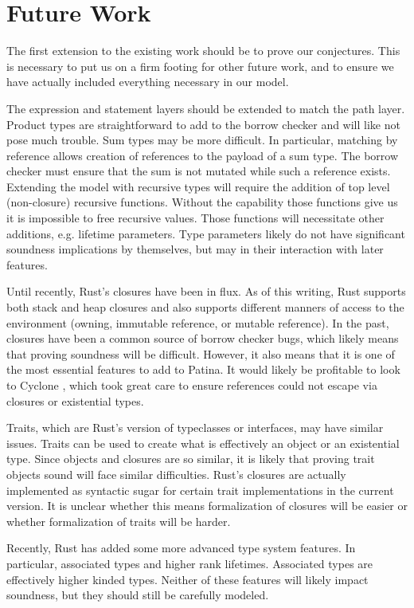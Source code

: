 \section*{Future Work}
The first extension to the existing work should be to prove our conjectures.
This is necessary to put us on a firm footing for other future work, and
to ensure we have actually included everything necessary in our model.

The expression and statement layers should be extended to match the path layer.
Product types are straightforward to add to the borrow checker and will like not
pose much trouble. Sum types may be more difficult. In particular, matching by
reference allows creation of references to the payload of a sum type.
The borrow checker must ensure that the sum is not mutated while such a reference
exists. Extending the model with recursive types will require the addition of
top level (non-closure) recursive functions. Without the capability those functions
give us it is impossible to free recursive values. Those functions will necessitate
other additions, e.g. lifetime parameters. Type parameters likely do not have
significant soundness implications by themselves, but may in their interaction with
later features.

Until recently, Rust's closures have been in flux. As of this writing, Rust supports
both stack and heap closures and also supports different manners of access to the environment
(owning, immutable reference, or mutable reference). In the past, closures have been a
common source of borrow checker bugs, which likely means that proving soundness will be
difficult. However, it also means that it is one of the most essential features to add to Patina.
It would likely be profitable to look to Cyclone \cite{cycregions}, which took great
care to ensure references could not escape via closures or existential types.

Traits, which are Rust's version of typeclasses or interfaces, may have similar issues.
Traits can be used to create what is effectively an object or an existential type.
Since objects and closures are so similar, it is likely that proving trait objects sound
will face similar difficulties. Rust's closures are actually implemented as syntactic sugar
for certain trait implementations in the current version. 
It is unclear whether this means formalization of closures will be easier
or whether formalization of traits will be harder.

Recently, Rust has added some more advanced type system features.
In particular, associated types and higher rank lifetimes.
Associated types are effectively higher kinded types.
Neither of these features will likely impact soundness, but they should still be
carefully modeled.

